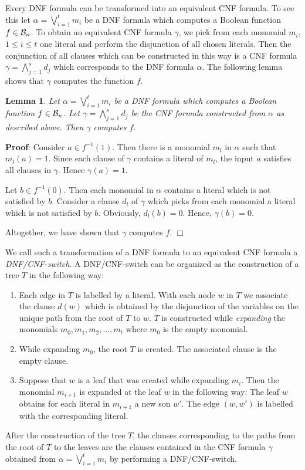 \documentclass[11pt]{article}
\newtheorem{lem}{Lemma}
\begin{document}
Every DNF formula can be transformed into an equivalent CNF formula. To see this let
$\alpha = \bigvee_{i=1}^t m_i$ be a DNF formula which computes a Boolean function $f \in {\cal B}_n$. To obtain an
equivalent CNF formula $\gamma$, we pick from each monomial $m_i$, $1 \leq i \leq t$ one literal and perform the
disjunction of all chosen literals. Then the conjunction of all clauses which can be constructed in this way
is a CNF formula $\gamma = \bigwedge_{j=1}^s d_j$ which corresponds to the DNF formula $\alpha$. The following lemma
shows that $\gamma$ computes the function $f$.
\begin{lem}  \label{lem2.1}
  Let $\alpha = \bigvee_{i=1}^t m_i$ be a DNF formula which computes a Boolean function $f \in {\cal B}_n$. Let
  $\gamma = \bigwedge_{j=1}^s d_j$ be the CNF formula constructed from $\alpha$ as described above. Then $\gamma$
  computes $f$.
\end{lem}
{\bf Proof}:
Consider $a \in f^{-1}(1)$. Then there is a monomial $m_l$ in $\alpha$ such that $m_l(a) = 1$. Since each clause of
$\gamma$ contains a literal of $m_l$, the input $a$ satisfies all clauses in $\gamma$. Hence $\gamma(a) = 1$.

Let $b \in f^{-1}(0)$. Then each monomial in $\alpha$ contains a literal which is not satisfied by $b$. Consider a
clause $d_l$ of $\gamma$ which picks from each monomial a literal which is not satisfied by $b$. Obviously,
$d_l(b) = 0$. Hence, $\gamma(b) = 0$.

Altogether, we have shown that $\gamma$ computes $f$.
$\Box$

\smallskip
We call such a transformation of a DNF formula to an equivalent CNF formula a {\em DNF/CNF-switch\/}.
A DNF/CNF-switch can be organized as the construction of a tree $T$ in the following way:
\begin{enumerate}
\item
  Each edge in $T$ is labelled by a literal. With each node $w$ in $T$ we associate the clause $d(w)$ which is
  obtained by the disjunction of the variables on the unique path from the root of $T$ to $w$. $T$ is constructed
  while {\em expanding\/} the monomials $m_0,m_1,m_2, \ldots,m_t$ where $m_0$ is the empty monomial.
\item
  While expanding $m_0$, the root $T$ is created. The associated clause is the empty clause.
\item
  Suppose that $w$ is a leaf that was created while expanding $m_i$. Then the monomial $m_{i+1}$ is expanded at
  the leaf $w$ in the following way: The leaf $w$ obtains for each literal in $m_{i+1}$ a new son $w'$. The edge
  $(w,w')$ is labelled with the corresponding literal.
\end{enumerate}
After the construction of the tree $T$, the clauses corresponding to the paths from the root of $T$ to the
leaves are the clauses contained in the CNF formula $\gamma$ obtained from $\alpha = \bigvee_{i=1}^t m_i$ by
performing a DNF/CNF-switch.
\end{document}
